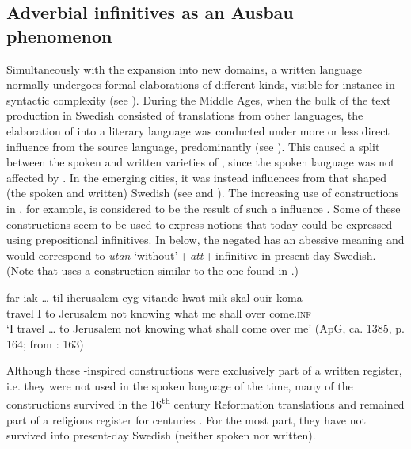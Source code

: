\documentclass[output=paper]{langscibook}
\begin{document}
\subsection{Adverbial infinitives as an Ausbau phenomenon}\label{sec:kalm:5.2}


Simultaneously with the expansion into new domains, a written language normally undergoes formal elaborations of different kinds, visible for instance in syntactic complexity (see \cites[38--39]{Fischer2007}[]{Kloss1967}). During the Middle Ages, when the bulk of the text production in Swedish consisted of translations from other languages, the elaboration of  into a literary language was conducted under more or less direct influence from the source language, predominantly  (see \citealt{Wollin1981,Wollin1983,Hoder2009, Hoder2010}). This caused a split between the spoken and written varieties of , since the spoken language was not affected by . In the emerging cities, it was instead influences from  that shaped (the spoken and written) Swedish (see  and ). The increasing use of  constructions in , for example, is considered to be the result of such a  influence \citep{Ahlberg1942,Hoder2010}. Some of these  constructions seem to be used to express  notions that today could be expressed using prepositional infinitives. In  below, the negated  has an abessive meaning and would correspond to \textit{utan} ‘without’\,+\,\textit{att}\,+\,infinitive in present-day Swedish. (Note that  uses a construction similar to the one found in .)


\ea 
\label{ex:kalm:33}
 \gll far {iak …} til iherusalem eyg vitande hwat mik skal ouir koma\\ 
travel I to Jerusalem not knowing what me shall over come.\textsc{inf}\\
 \glt ‘I travel … to Jerusalem not knowing what shall come over me’ (ApG, ca. 1385, p. 164; from \citealt{Ahlberg1942}: 163)
\z


Although these -inspired constructions were exclusively part of a written register, i.e. they were not used in the spoken language of the time, many of the  constructions survived in the 16\textsuperscript{th} century Reformation  translations and remained part of a religious register for centuries \citep[17–19]{Stahle1970}. For the most part, they have not survived into present-day Swedish (neither spoken nor written). 
\end{document}
